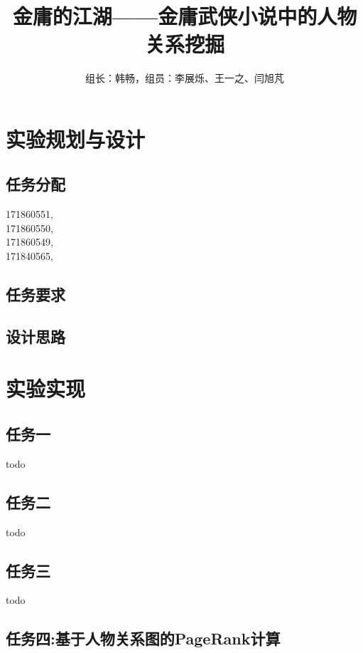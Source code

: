 \documentclass[a4paper,UTF8]{article}
\author{组长：韩畅，组员：李展烁、王一之、闫旭芃}
\numberwithin{equation}{section}
\begin{document}
{}
\title{金庸的江湖——金庸武侠小说中的人物关系挖掘}
\maketitle

\section{实验规划与设计}
\subsection{任务分配}
{171860551, }\\ \indent
{171860550, }\\ \indent
{171860549, }\\ \indent
{171840565, }
\subsection{任务要求}

\subsection{设计思路}


\section{实验实现}
\subsection{任务一}
todo

\subsection{任务二}
todo

\subsection{任务三}
todo

\subsection{任务四:基于人物关系图的PageRank计算}
\end{document}
